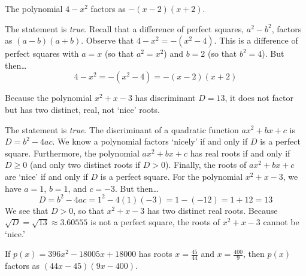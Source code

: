 \documentclass[11pt,letterpaper]{article}
\begin{document}
\newpage



 The polynomial $4 - x^2$ factors as $-(x - 2)(x + 2)$. \pspace

\sol The statement is \textit{true}. Recall that a difference of perfect squares, $a^2 - b^2$, factors as $(a - b)(a + b)$. Observe that $4 - x^2= -(x^2 - 4)$. This is a difference of perfect squares with $a= x$ (so that $a^2= x^2$) and $b= 2$ (so that $b^2= 4$). But then\dots
	\[
	4 - x^2= -(x^2 - 4)= -(x - 2)(x + 2)
	\] \pvspace{1.3cm}



 Because the polynomial $x^2 + x - 3$ has discriminant $D= 13$, it does not factor but has two distinct, real, not `nice' roots. \pspace

\sol The statement is \textit{true}. The discriminant of a quadratic function $ax^2 + bx + c$ is $D= b^2 - 4ac$. We know a polynomial factors `nicely' if and only if $D$ is a perfect square. Furthermore, the polynomial $ax^2 + bx + c$ has real roots if and only if $D \geq 0$ (and only two distinct roots if $D > 0$). Finally, the roots of $ax^2 + bx + c$ are `nice' if and only if $D$ is a perfect square. For the polynomial $x^2 + x - 3$, we have $a= 1$, $b= 1$, and $c= -3$. But then\dots
	\[
	D= b^2 - 4ac= 1^2 - 4(1)(-3)= 1 - (-12)= 1 + 12= 13
	\]
We see that $D > 0$, so that $x^2 + x - 3$ has two distinct real roots. Because $\sqrt{D}= \sqrt{13} \approx 3.60555$ is not a perfect square, the roots of $x^2 + x - 3$ cannot be `nice.' \pvspace{1.3cm}



 If $p(x)= 396x^2 - 18005x + 18000$ has roots $x= \frac{45}{44}$ and $x= \frac{400}{9}$, then $p(x)$ factors as $(44x - 45)(9x - 400)$. \pspace
\end{document}
